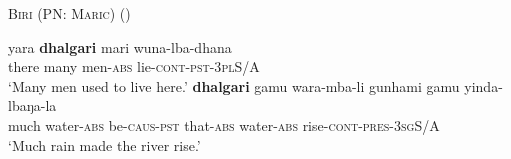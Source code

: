 \documentclass[12pt,egregdoesnotlikesansseriftitles]{scrartcl}
\begin{document}
\begin{exe}
\ex \textsc{Biri (PN: Maric}) (\cite[54]{terrill98}) \label{manymuch1}
\begin{xlist} 
\ex  \gll  yara    \textbf{dhalgari}    mari        wuna-lba-dhana \\
    there    many        men-\textsc{abs}    lie-\textsc{cont-pst}-3\textsc{pl}S/A \\
    `Many men used to live here.'
\ex \gll \textbf{dhalgari}    gamu        wara-mba-li        gunhami    gamu     yinda-lbaŋa-la  \\   
    much        water-\textsc{abs}    be\textsc{-caus-pst}    that-\textsc{abs}    water-\textsc{abs}  rise-\textsc{cont-pres}-3\textsc{sg}S/A\\
    `Much rain made the river rise.'
\end{xlist}
\end{exe}
\end{document}
